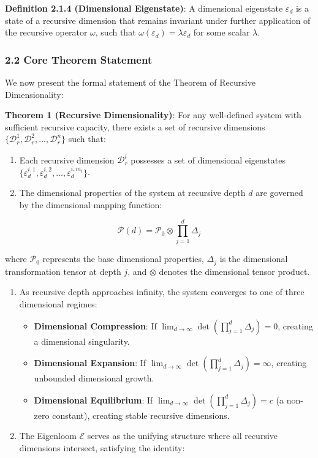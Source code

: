 \documentclass[
]{article}
\providecommand{\tightlist}{%
  \setlength{\itemsep}{0pt}\setlength{\parskip}{0pt}}
\begin{document}
\textbf{Definition 2.1.4 (Dimensional Eigenstate)}: A dimensional
eigenstate \(\varepsilon_d\) is a state of a recursive dimension that
remains invariant under further application of the recursive operator
\(\omega\), such that \(\omega(\varepsilon_d) = \lambda \varepsilon_d\)
for some scalar \(\lambda\).

\subsubsection{2.2 Core Theorem Statement}\label{core-theorem-statement}

We now present the formal statement of the Theorem of Recursive
Dimensionality:

\textbf{Theorem 1 (Recursive Dimensionality)}: For any well-defined
system with sufficient recursive capacity, there exists a set of
recursive dimensions
\(\{\mathcal{D}_r^1, \mathcal{D}_r^2, ..., \mathcal{D}_r^n\}\) such
that:

\begin{enumerate}
\def\labelenumi{\arabic{enumi}.}
\item
  Each recursive dimension \(\mathcal{D}_r^i\) possesses a set of
  dimensional eigenstates
  \(\{\varepsilon_d^{i,1}, \varepsilon_d^{i,2}, ..., \varepsilon_d^{i,m_i}\}\).
\item
  The dimensional properties of the system at recursive depth \(d\) are
  governed by the dimensional mapping function:
\end{enumerate}

\[\mathcal{P}(d) = \mathcal{P}_0 \otimes \prod_{j=1}^{d} \Delta_j\]

where \(\mathcal{P}_0\) represents the base dimensional properties,
\(\Delta_j\) is the dimensional transformation tensor at depth \(j\),
and \(\otimes\) denotes the dimensional tensor product.

\begin{enumerate}
\def\labelenumi{\arabic{enumi}.}
\setcounter{enumi}{2}
\tightlist
\item
  As recursive depth approaches infinity, the system converges to one of
  three dimensional regimes:

  \begin{itemize}
  \tightlist
  \item
    \textbf{Dimensional Compression}: If
    \(\lim_{d \to \infty} \det(\prod_{j=1}^{d} \Delta_j) = 0\), creating
    a dimensional singularity.
  \item
    \textbf{Dimensional Expansion}: If
    \(\lim_{d \to \infty} \det(\prod_{j=1}^{d} \Delta_j) = \infty\),
    creating unbounded dimensional growth.
  \item
    \textbf{Dimensional Equilibrium}: If
    \(\lim_{d \to \infty} \det(\prod_{j=1}^{d} \Delta_j) = c\) (a
    non-zero constant), creating stable recursive dimensions.
  \end{itemize}
\item
  The Eigenloom \(\mathcal{E}\) serves as the unifying structure where
  all recursive dimensions intersect, satisfying the identity:
\end{enumerate}
\end{document}
